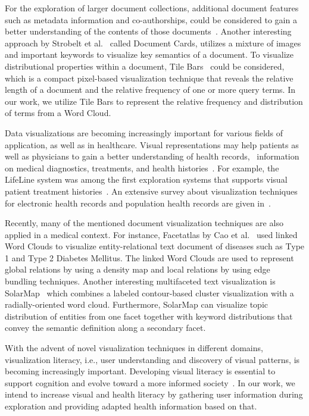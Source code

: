 For the exploration of larger document collections, additional document features such as metadata information and co-authorships, could be considered to gain a better understanding of the contents of those documents~\cite{6392833, 7583708}. 
%
Another interesting approach by Strobelt et al.~\cite{5290723} called Document Cards, utilizes a mixture of images and important keywords to visualize key semantics of a document. 
%
To visualize distributional properties within a document, Tile Bars~\cite{hearst1995tilebars,keim2007literature} could be considered, which is a compact pixel-based visualization technique that reveals the relative length of a document and the relative frequency of one or more query terms. 
%
In our work, we utilize Tile Bars to represent the relative frequency and distribution of terms from a Word Cloud.



Data visualizations are becoming increasingly important for various fields of application, as well as in healthcare. 
%
Visual representations may help patients as well as physicians to gain a better understanding of health records, \eg\ information on medical diagnostics, treatments, and health histories~\cite{HCI-039}. 
%
For example, the LifeLine system was among the first exploration systems that supports visual patient treatment histories~\cite{10.1145/286498.286513}. 
%
An extensive survey about visualization techniques for electronic health records and population health records are given in~\cite{DBLP:journals/cgf/WangL22}.


Recently, many of the mentioned document visualization techniques are also applied in a medical context. 
%
For instance, Facetatlas by Cao et al.~\cite{5613456} used linked Word Clouds to visualize entity-relational text document of diseases such as Type 1 and Type 2 Diabetes
Mellitus. 
%
The linked Word Clouds are used to represent global relations by using a density map and local relations by using edge bundling techniques. 
%
Another interesting multifaceted text visualization is SolarMap~\cite{6137214} which combines a labeled contour-based cluster visualization with a radially-oriented word cloud.
%
Furthermore, SolarMap can visualize topic distribution of entities from one facet together with keyword distributions that convey the semantic definition along a secondary facet.


With the advent of novel visualization techniques in different domains, visualization literacy, i.e., user understanding and discovery of visual patterns, is becoming increasingly important. 
%
Developing visual literacy is essential to support cognition and evolve toward a more informed society~\cite{doi:10.1177/14738716221081831}. 
%
In our work, we intend to increase visual and health literacy by gathering user information during exploration and providing adapted health information based on that.



